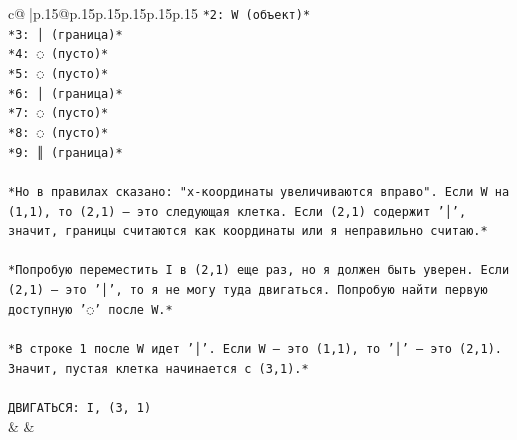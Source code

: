 \documentclass{article}
\begin{document}
{\begin{supertabular}{c@{$\;$}|p{.15\linewidth}@{}p{.15\linewidth}p{.15\linewidth}p{.15\linewidth}p{.15\linewidth}p{.15\linewidth}}
{{{\texttt{*2: W (объект)*} \\
\texttt{*3: │ (граница)*} \\
\texttt{*4: ◌ (пусто)*} \\
\texttt{*5: ◌ (пусто)*} \\
\texttt{*6: │ (граница)*} \\
\texttt{*7: ◌ (пусто)*} \\
\texttt{*8: ◌ (пусто)*} \\
\texttt{*9: ║ (граница)*} \\
\\ 
\texttt{*Но в правилах сказано: "x{-}координаты увеличиваются вправо". Если W на (1,1), то (2,1) — это следующая клетка. Если (2,1) содержит '│', значит, границы считаются как координаты или я неправильно считаю.*} \\
\\ 
\texttt{*Попробую переместить I в (2,1) еще раз, но я должен быть уверен. Если (2,1) — это '│', то я не могу туда двигаться. Попробую найти первую доступную '◌' после W.*} \\
\\ 
\texttt{*В строке 1 после W идет '│'. Если W — это (1,1), то '│' — это (2,1). Значит, пустая клетка начинается с (3,1).*} \\
\\ 
\texttt{ДВИГАТЬСЯ: I, (3, 1)} \\
            }
        }
    }
    & & \\ \\


\end{supertabular}}
\end{document}
